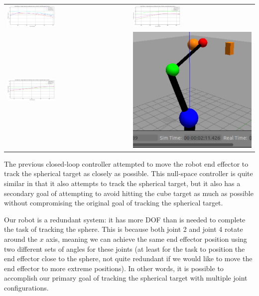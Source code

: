 \documentclass[11pt]{article}
\begin{document}
\begin{center}
    \begin{tabular}{ll}
        \includegraphics[width=0.4\textwidth]{images/nullspace_x.png}
        &
        \includegraphics[width=0.4\textwidth]{images/nullspace_y.png} \\
        \includegraphics[width=0.4\textwidth]{images/nullspace_z.png} & \includegraphics[height=0.18\textwidth]{images/nullspace_pic.png}
    \end{tabular}
\end{center}

The previous closed-loop controller attempted to move the robot end effector to track the spherical target as closely as possible. This null-space controller is quite similar in that it also attempts to track the spherical target, but it also has a secondary goal of attempting to avoid hitting the cube target as much as possible without compromising the original goal of tracking the spherical target.

Our robot is a redundant system: it has more DOF than is needed to complete the task of tracking the sphere. This is because both joint 2 and joint 4 rotate around the \(x\) axis, meaning we can achieve the same end effector position using two different sets of angles for these joints (at least for the task to position the end effector close to the sphere, not quite redundant if we would like to move the end effector to more extreme positions). In other words, it is possible to accomplish our primary goal of tracking the spherical target with multiple joint configurations.
\end{document}
